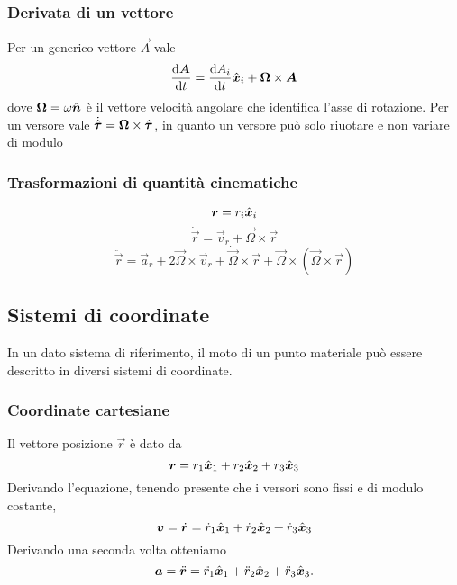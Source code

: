 \subsubsection{Derivata di un vettore}
Per un generico vettore $ \vec A $ vale
\begin{equation}
\frac{\dif\vec A}{\dif{t}} = \frac{\dif A_i}{\dif{t}} \vers{x}_i + \vec \Omega \times \vec A
\end{equation}
dove $ \boldsymbol{\Omega} = \omega \hat{\boldsymbol{n}} $ è il vettore velocità angolare che identifica l'asse di rotazione. Per un versore vale $ \dot{\hat{\boldsymbol{\tau}}} = \boldsymbol{\Omega} \times \hat{\boldsymbol{\tau}} $, in quanto un versore può solo riuotare e non variare di modulo

\subsubsection{Trasformazioni di quantità cinematiche}
\begin{equation}
\boldsymbol{r} = r_i \hat{\boldsymbol{x}}_i 
\end{equation}
\begin{equation}
\dot{\vec{r}} = \vec{v}_r + \vec{\Omega} \times \vec{r}
\end{equation}
\begin{equation}
\ddot{\vec{r}} = \vec{a}_r + 2 \vec{\Omega} \times \vec{v}_r + \dot{\vec{\Omega}} \times \vec{r} + \vec{\Omega} \times (\vec{\Omega} \times \vec{r})
\end{equation}

\subsection{Sistemi di coordinate}
In un dato sistema di riferimento, il moto di un punto materiale può essere descritto in diversi sistemi di coordinate.

\subsubsection{Coordinate cartesiane}
Il vettore posizione $ \vec r $ è dato da 
\begin{equation}
\boldsymbol{r} = r_1 \hat{\boldsymbol{x}}_1 + r_2 \hat{\boldsymbol{x}}_2 + r_3 \hat{\boldsymbol{x}}_3
\end{equation}
Derivando l'equazione, tenendo presente che i versori sono fissi e di modulo costante, 
\begin{equation}
\boldsymbol{v} = \dot{\boldsymbol{r}} = \dot{r}_1 \hat{\boldsymbol{x}}_1 + \dot{r}_2 \hat{\boldsymbol{x}}_2 + \dot{r}_3 \hat{\boldsymbol{x}}_3
\end{equation}
Derivando una seconda volta otteniamo
\begin{equation}
\boldsymbol{a} = \ddot{\boldsymbol{r}} = \ddot{r}_1 \hat{\boldsymbol{x}}_1 + \ddot{r}_2 \hat{\boldsymbol{x}}_2 + \ddot{r}_3 \hat{\boldsymbol{x}}_3.
\end{equation}

